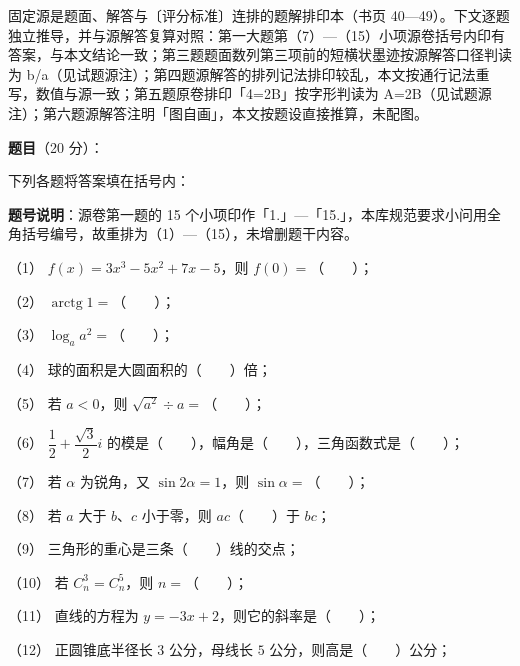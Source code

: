 

\begin{gktip}
固定源是题面、解答与〔评分标准〕连排的题解排印本（书页 40—49）。下文逐题独立推导，并与源解答复算对照：第一大题第（7）—（15）小项源卷括号内印有答案，与本文结论一致；第三题题面数列第三项前的短横状墨迹按源解答口径判读为 b/a（见试题源注）；第四题源解答的排列记法排印较乱，本文按通行记法重写，数值与源一致；第五题原卷排印「4=2B」按字形判读为 A=2B（见试题源注）；第六题源解答注明「图自画」，本文按题设直接推算，未配图。
\end{gktip}

\begin{answer}

\textbf{题目}（20 分）：

下列各题将答案填在括号内：

\begin{gktip}
\textbf{题号说明}：源卷第一题的 15 个小项印作「1.」—「15.」，本库规范要求小问用全角括号编号，故重排为（1）—（15），未增删题干内容。
\end{gktip}

（1） $f(x)=3x^3-5x^2+7x-5$，则 $f(0)=$\mbox{（　　）}；

（2） $\operatorname{arctg}1=$\mbox{（　　）}；

（3） $\log_a a^2=$\mbox{（　　）}；

（4） 球的面积是大圆面积的\mbox{（　　）}倍；

（5） 若 $a<0$，则 $\sqrt{a^2}\div a=$\mbox{（　　）}；

（6） $\dfrac12+\dfrac{\sqrt3}{2}i$ 的模是\mbox{（　　）}，幅角是\mbox{（　　）}，三角函数式是\mbox{（　　）}；

（7） 若 $\alpha$ 为锐角，又 $\sin 2\alpha=1$，则 $\sin\alpha=$\mbox{（　　）}；

（8） 若 $a$ 大于 $b$、$c$ 小于零，则 $ac$\mbox{（　　）}于 $bc$；

（9） 三角形的重心是三条\mbox{（　　）}线的交点；

（10） 若 $C_n^3=C_n^5$，则 $n=$\mbox{（　　）}；

（11） 直线的方程为 $y=-3x+2$，则它的斜率是\mbox{（　　）}；

（12） 正圆锥底半径长 $3$ 公分，母线长 $5$ 公分，则高是\mbox{（　　）}公分；


\end{answer}
